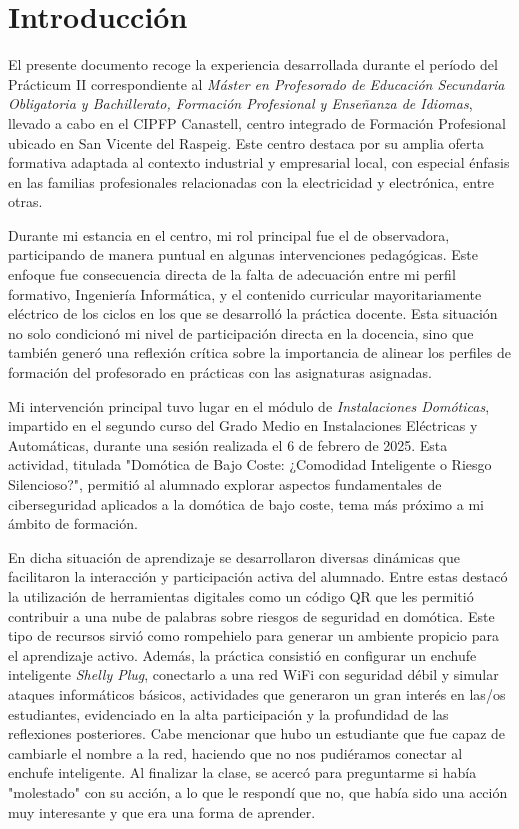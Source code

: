 \chapter{Introducción}
El presente documento recoge la experiencia desarrollada durante el período del Prácticum II correspondiente al \textit{Máster en Profesorado de Educación Secundaria Obligatoria y Bachillerato, Formación Profesional y Enseñanza de Idiomas}, llevado a cabo en el CIPFP Canastell, centro integrado de Formación Profesional ubicado en San Vicente del Raspeig. Este centro destaca por su amplia oferta formativa adaptada al contexto industrial y empresarial local, con especial énfasis en las familias profesionales relacionadas con la electricidad y electrónica, entre otras.

Durante mi estancia en el centro, mi rol principal fue el de observadora, participando de manera puntual en algunas intervenciones pedagógicas. Este enfoque fue consecuencia directa de la falta de adecuación entre mi perfil formativo, Ingeniería Informática, y el contenido curricular mayoritariamente eléctrico de los ciclos en los que se desarrolló la práctica docente. Esta situación no solo condicionó mi nivel de participación directa en la docencia, sino que también generó una reflexión crítica sobre la importancia de alinear los perfiles de formación del profesorado en prácticas con las asignaturas asignadas.

Mi intervención principal tuvo lugar en el módulo de \textit{Instalaciones Domóticas}, impartido en el segundo curso del Grado Medio en Instalaciones Eléctricas y Automáticas, durante una sesión realizada el 6 de febrero de 2025. Esta actividad, titulada "Domótica de Bajo Coste: ¿Comodidad Inteligente o Riesgo Silencioso?", permitió al alumnado explorar aspectos fundamentales de ciberseguridad aplicados a la domótica de bajo coste, tema más próximo a mi ámbito de formación.

En dicha situación de aprendizaje se desarrollaron diversas dinámicas que facilitaron la interacción y participación activa del alumnado. Entre estas destacó la utilización de herramientas digitales como un código QR que les permitió contribuir a una nube de palabras sobre riesgos de seguridad en domótica. Este tipo de recursos sirvió como rompehielo para generar un ambiente propicio para el aprendizaje activo. Además, la práctica consistió en configurar un enchufe inteligente \textit{Shelly Plug}, conectarlo a una red WiFi con seguridad débil y simular ataques informáticos básicos, actividades que generaron un gran interés en las/os estudiantes, evidenciado en la alta participación y la profundidad de las reflexiones posteriores.
Cabe mencionar que hubo un estudiante que fue capaz de cambiarle el nombre a la red, haciendo que no nos pudiéramos conectar al enchufe inteligente. Al finalizar la clase, se acercó para preguntarme si había "molestado" con su acción, a lo que le respondí que no, que había sido una acción muy interesante y que era una forma de aprender.

